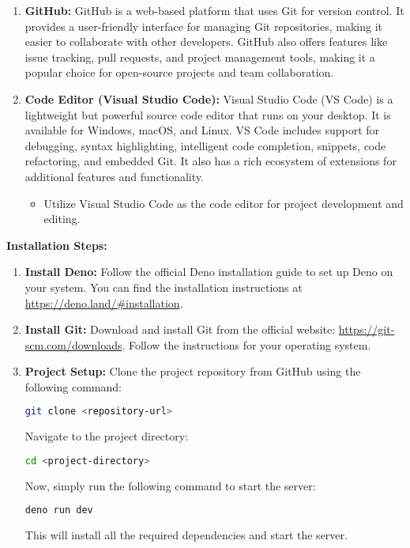 \documentclass[12pt,a4paper]{report}
\begin{document}
\begin{enumerate}
    \item \textbf{GitHub:}
    GitHub is a web-based platform that uses Git for version control. It
    provides a user-friendly interface for managing Git repositories, making it
    easier to collaborate with other developers. GitHub also offers features
    like issue tracking, pull requests, and project management tools, making it
    a popular choice for open-source projects and team collaboration.

    \item \textbf{Code Editor (Visual Studio Code):}
    Visual Studio Code (VS Code) is a lightweight but powerful source code
    editor that runs on your desktop. It is available for Windows, macOS, and
    Linux. VS Code includes support for debugging, syntax highlighting,
    intelligent code completion, snippets, code refactoring, and embedded
    Git. It also has a rich ecosystem of extensions for additional features
    and functionality.
    \begin{itemize}
        \item Utilize Visual Studio Code as the code editor for project development
        and editing.
    \end{itemize}
\end{enumerate}

\textbf{Installation Steps:}
\begin{enumerate}
    \item \textbf{Install Deno:}
    Follow the official Deno installation guide to set up Deno on your system.
    You can find the installation instructions at
    \url{https://deno.land/#installation}.

    \item \textbf{Install Git:}
    Download and install Git from the official website:
    \url{https://git-scm.com/downloads}. Follow the instructions for your
    operating system.

    \item \textbf{Project Setup:}
    Clone the project repository from GitHub using the following command:
    \begin{lstlisting}[language=bash]
        git clone <repository-url>
    \end{lstlisting}
    Navigate to the project directory:
    \begin{lstlisting}[language=bash]
        cd <project-directory>
    \end{lstlisting}
    Now, simply run the following command to start the server:
    \begin{lstlisting}[language=bash]
        deno run dev
    \end{lstlisting}
    This will install all the required dependencies and start the server.
\end{enumerate}
\end{document}
